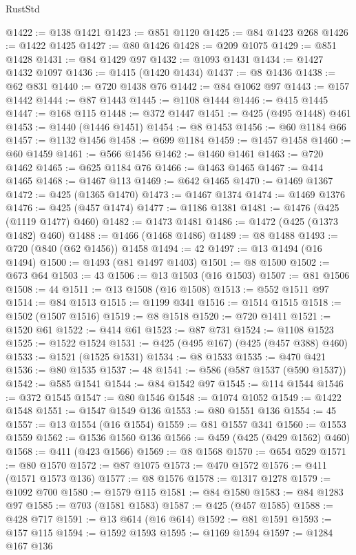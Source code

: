 \begin{lexlean}{RustStd}
\begin{coremodule}
{\begin{coremodule}
{{{{{{{{{{{{{{{{{{{{{{{{{{{{{{{{{{{{{{{{{{{{{{{{{{{{{@1422 := @138 @1421
@1423 := @851 @1120
@1425 := @84 @1423 @268
@1426 := @1422 @1425
@1427 := @80 @1426
@1428 := @209 @1075
@1429 := @851 @1428
@1431 := @84 @1429 @97
@1432 := @1093 @1431
@1434 := @1427 @1432 @1097
@1436 := @1415 (@1420 @1434)
@1437 := @8 @1436
@1438 := @62 @831
@1440 := @720 @1438 @76
@1442 := @84 @1062 @97
@1443 := @157 @1442
@1444 := @87 @1443
@1445 := @1108 @1444
@1446 := @415 @1445
@1447 := @168 @115
@1448 := @372 @1447
@1451 := @425 (@495 @1448) @461
@1453 := @1440 (@1446 @1451)
@1454 := @8 @1453
@1456 := @60 @1184 @66
@1457 := @1132 @1456
@1458 := @699 @1184
@1459 := @1457 @1458
@1460 := @60 @1459
@1461 := @566 @1456
@1462 := @1460 @1461
@1463 := @720 @1462
@1465 := @625 @1184 @76
@1466 := @1463 @1465
@1467 := @414 @1465
@1468 := @1467 @113
@1469 := @642 @1465
@1470 := @1469 @1367
@1472 := @425 (@1365 @1470)
@1473 := @1467 @1374
@1474 := @1469 @1376
@1476 := @425 (@457 @1474)
@1477 := @1186 @1381
@1481 := @1476 (@425 (@1119 @1477) @460)
@1482 := @1473 @1481
@1486 := @1472 (@425 (@1373 @1482) @460)
@1488 := @1466 (@1468 @1486)
@1489 := @8 @1488
@1493 := @720 (@840 (@62 @1456)) @1458
@1494 := 42
@1497 := @13 @1494 (@16 @1494)
@1500 := @1493 (@81 @1497 @1403)
@1501 := @8 @1500
@1502 := @673 @64
@1503 := 43
@1506 := @13 @1503 (@16 @1503)
@1507 := @81 @1506
@1508 := 44
@1511 := @13 @1508 (@16 @1508)
@1513 := @552 @1511 @97
@1514 := @84 @1513
@1515 := @1199 @341
@1516 := @1514 @1515
@1518 := @1502 (@1507 @1516)
@1519 := @8 @1518
@1520 := @720 @1411
@1521 := @1520 @61
@1522 := @414 @61
@1523 := @87 @731
@1524 := @1108 @1523
@1525 := @1522 @1524
@1531 := @425 (@495 @167) (@425 (@457 @388) @460)
@1533 := @1521 (@1525 @1531)
@1534 := @8 @1533
@1535 := @470 @421
@1536 := @80 @1535
@1537 := 48
@1541 := @586 (@587 @1537 (@590 @1537))
@1542 := @585 @1541
@1544 := @84 @1542 @97
@1545 := @114 @1544
@1546 := @372 @1545
@1547 := @80 @1546
@1548 := @1074 @1052
@1549 := @1422 @1548
@1551 := @1547 @1549 @136
@1553 := @80 @1551 @136
@1554 := 45
@1557 := @13 @1554 (@16 @1554)
@1559 := @81 @1557 @341
@1560 := @1553 @1559
@1562 := @1536 @1560 @136
@1566 := @459 (@425 (@429 @1562) @460)
@1568 := @411 (@423 @1566)
@1569 := @8 @1568
@1570 := @654 @529
@1571 := @80 @1570
@1572 := @87 @1075
@1573 := @470 @1572
@1576 := @411 (@1571 @1573 @136)
@1577 := @8 @1576
@1578 := @1317 @1278
@1579 := @1092 @700
@1580 := @1579 @115
@1581 := @84 @1580
@1583 := @84 @1283 @97
@1585 := @703 (@1581 @1583)
@1587 := @425 (@457 @1585)
@1588 := @428 @717
@1591 := @13 @614 (@16 @614)
@1592 := @81 @1591
@1593 := @157 @115
@1594 := @1592 @1593
@1595 := @1169 @1594
@1597 := @1284 @167 @136
}}}}}}}}}}}}}}}}}}}}}}}}}}}}}}}}}}}}}}}}}}}}}}}}}}}}}
\end{coremodule}}
\end{coremodule}
\end{lexlean}
